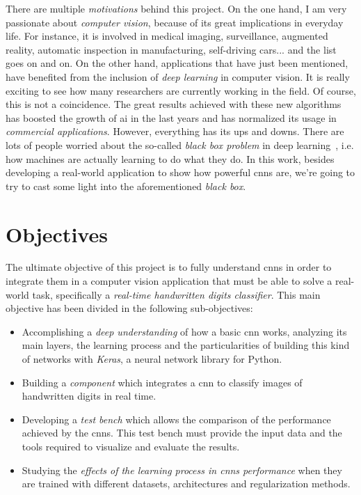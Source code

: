 There are multiple \emph{motivations} behind this project. On the one hand, I am very passionate about \emph{computer vision}, because of its great implications in everyday life. For instance, it is involved in medical imaging, surveillance, augmented reality, automatic inspection in manufacturing, self-driving cars... and the list goes on and on. On the other hand, applications that have just been mentioned, have benefited from the inclusion of \emph{deep learning} in computer vision. It is really exciting to see how many researchers are currently working in the field. Of course, this is not a coincidence. The great results achieved with these new algorithms has boosted the growth of \gls{ai} in the last years and has normalized its usage in \emph{commercial applications}. However, everything has its ups and downs. There are lots of people worried about the so-called \emph{\textit{black box} problem} in deep learning~\cite{black-box}, i.e. how machines are actually learning to do what they do. In this work, besides developing a real-world application to show how powerful \glspl{cnn} are, we're going to try to cast some light into the aforementioned \textit{black box}. 

\section{Objectives}\label{sec:objectives}
The ultimate objective of this project is to fully understand \glspl{cnn} in order to integrate them in a computer vision application that must be able to solve a real-world task, specifically a \emph{real-time handwritten digits classifier}. This main objective has been divided in the following sub-objectives: 
\begin{itemize}
	\item Accomplishing a \emph{deep understanding} of how a basic \gls{cnn} works, analyzing its main layers, the learning process and the particularities of building this kind of networks with \emph{Keras}, a neural network library for Python.
	\item Building a \emph{component} which integrates a \gls{cnn} to classify images of handwritten digits in real time.
	\item Developing a \emph{test bench} which allows the comparison of the performance achieved by the \glspl{cnn}. This test bench must provide the input data and the tools required to visualize and evaluate the results.
	\item Studying the \emph{effects of the learning process in \glspl{cnn} performance} when they are trained with different datasets, architectures and regularization methods.
\end{itemize}

